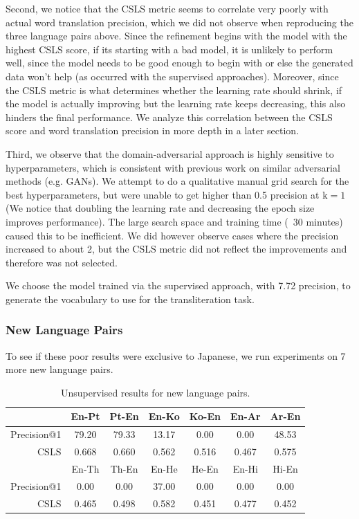 \documentclass{article}
\begin{document}
Second, we notice that the CSLS metric seems to correlate very poorly
with actual word translation precision, which we did not observe when reproducing
the three language pairs above. Since the refinement begins with the model with
the highest CSLS score, if its starting with a bad model, it is unlikely to
perform well, since the model needs to be good enough to begin with or else the
generated data won't help (as occurred with the supervised approaches). Moreover,
since the CSLS metric is what determines whether the learning rate should shrink,
if the model is actually improving but the learning rate keeps decreasing, this
also hinders the final performance. We analyze this correlation between the CSLS
score and word translation precision in more depth in a later section.

Third, we observe that the domain-adversarial approach is highly sensitive to
hyperparameters, which is consistent with previous work on similar adversarial
methods (e.g. GANs). We attempt to do a qualitative manual grid search for
the best hyperparameters, but were unable to get higher than 0.5 precision at
$\text{k}=1$ (We notice that doubling the learning rate and decreasing the epoch
size improves performance). The large search space and training time (~30 minutes)
caused this to be inefficient. We did however observe cases where the precision
increased to about 2, but the CSLS metric did not reflect the improvements and
therefore was not selected.

We choose the model trained via the supervised approach, with 7.72 precision, to
generate the vocabulary to use for the transliteration task.

\subsubsection*{New Language Pairs}

To see if these poor results were exclusive to Japanese, we run experiments
on 7 more new language pairs.

\begin{table}[h]
  \centering
  \begin{tabular}{r|cc|cc|cc}
    \toprule
    & En-Pt & Pt-En & En-Ko & Ko-En & En-Ar & Ar-En \\
    \midrule
    Precision@1 & 79.20 & 79.33 & 13.17 &  0.00 &  0.00 & 48.53 \\
    CSLS        & 0.668 & 0.660 & 0.562 & 0.516 & 0.467 & 0.575 \\
    \midrule
    \midrule
    & En-Th & Th-En & En-He & He-En & En-Hi & Hi-En \\
    \midrule
    Precision@1 &  0.00 &  0.00 & 37.00 &  0.00 &  0.00 &  0.00 \\
    CSLS        & 0.465 & 0.498 & 0.582 & 0.451 & 0.477 & 0.452 \\
    \bottomrule
  \end{tabular}
  \caption{Unsupervised results for new language pairs.}
\end{table}
\end{document}
